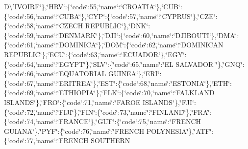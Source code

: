 {D\textbackslash{}'I\-V\-O\-I\-R\-E\char`\"{}\},\char`\"{}H\-R\-V\char`\"{}\-:\{\char`\"{}code\char`\"{}\-:55,\char`\"{}name\char`\"{}\-:\char`\"{}C\-R\-O\-A\-T\-I\-A\char`\"{}\},\char`\"{}C\-U\-B\char`\"{}\-:\{\char`\"{}code\char`\"{}\-:56,\char`\"{}name\char`\"{}\-:\char`\"{}C\-U\-B\-A\char`\"{}\},\char`\"{}C\-Y\-P\char`\"{}\-:\{\char`\"{}code\char`\"{}\-:57,\char`\"{}name\char`\"{}\-:\char`\"{}C\-Y\-P\-R\-U\-S\char`\"{}\},\char`\"{}C\-Z\-E\char`\"{}\-:\{\char`\"{}code\char`\"{}\-:58,\char`\"{}name\char`\"{}\-:\char`\"{}C\-Z\-E\-C\-H R\-E\-P\-U\-B\-L\-I\-C\char`\"{}\},\char`\"{}D\-N\-K\char`\"{}\-:\{\char`\"{}code\char`\"{}\-:59,\char`\"{}name\char`\"{}\-:\char`\"{}D\-E\-N\-M\-A\-R\-K\char`\"{}\},\char`\"{}D\-J\-I\char`\"{}\-:\{\char`\"{}code\char`\"{}\-:60,\char`\"{}name\char`\"{}\-:\char`\"{}D\-J\-I\-B\-O\-U\-T\-I\char`\"{}\},\char`\"{}D\-M\-A\char`\"{}\-:\{\char`\"{}code\char`\"{}\-:61,\char`\"{}name\char`\"{}\-:\char`\"{}D\-O\-M\-I\-N\-I\-C\-A\char`\"{}\},\char`\"{}D\-O\-M\char`\"{}\-:\{\char`\"{}code\char`\"{}\-:62,\char`\"{}name\char`\"{}\-:\char`\"{}D\-O\-M\-I\-N\-I\-C\-A\-N R\-E\-P\-U\-B\-L\-I\-C\char`\"{}\},\char`\"{}E\-C\-U\char`\"{}\-:\{\char`\"{}code\char`\"{}\-:63,\char`\"{}name\char`\"{}\-:\char`\"{}E\-C\-U\-A\-D\-O\-R\char`\"{}\},\char`\"{}E\-G\-Y\char`\"{}\-:\{\char`\"{}code\char`\"{}\-:64,\char`\"{}name\char`\"{}\-:\char`\"{}E\-G\-Y\-P\-T\char`\"{}\},\char`\"{}S\-L\-V\char`\"{}\-:\{\char`\"{}code\char`\"{}\-:65,\char`\"{}name\char`\"{}\-:\char`\"{}E\-L S\-A\-L\-V\-A\-D\-O\-R \char`\"{}\},\char`\"{}G\-N\-Q\char`\"{}\-:\{\char`\"{}code\char`\"{}\-:66,\char`\"{}name\char`\"{}\-:\char`\"{}E\-Q\-U\-A\-T\-O\-R\-I\-A\-L G\-U\-I\-N\-E\-A\char`\"{}\},\char`\"{}E\-R\-I\char`\"{}\-:\{\char`\"{}code\char`\"{}\-:67,\char`\"{}name\char`\"{}\-:\char`\"{}E\-R\-I\-T\-R\-E\-A\char`\"{}\},\char`\"{}E\-S\-T\char`\"{}\-:\{\char`\"{}code\char`\"{}\-:68,\char`\"{}name\char`\"{}\-:\char`\"{}E\-S\-T\-O\-N\-I\-A\char`\"{}\},\char`\"{}E\-T\-H\char`\"{}\-:\{\char`\"{}code\char`\"{}\-:69,\char`\"{}name\char`\"{}\-:\char`\"{}E\-T\-H\-I\-O\-P\-I\-A\char`\"{}\},\char`\"{}F\-L\-K\char`\"{}\-:\{\char`\"{}code\char`\"{}\-:70,\char`\"{}name\char`\"{}\-:\char`\"{}F\-A\-L\-K\-L\-A\-N\-D I\-S\-L\-A\-N\-D\-S\char`\"{}\},\char`\"{}F\-R\-O\char`\"{}\-:\{\char`\"{}code\char`\"{}\-:71,\char`\"{}name\char`\"{}\-:\char`\"{}F\-A\-R\-O\-E I\-S\-L\-A\-N\-D\-S\char`\"{}\},\char`\"{}F\-J\-I\char`\"{}\-:\{\char`\"{}code\char`\"{}\-:72,\char`\"{}name\char`\"{}\-:\char`\"{}F\-I\-J\-I\char`\"{}\},\char`\"{}F\-I\-N\char`\"{}\-:\{\char`\"{}code\char`\"{}\-:73,\char`\"{}name\char`\"{}\-:\char`\"{}F\-I\-N\-L\-A\-N\-D\char`\"{}\},\char`\"{}F\-R\-A\char`\"{}\-:\{\char`\"{}code\char`\"{}\-:74,\char`\"{}name\char`\"{}\-:\char`\"{}F\-R\-A\-N\-C\-E\char`\"{}\},\char`\"{}G\-U\-F\char`\"{}\-:\{\char`\"{}code\char`\"{}\-:75,\char`\"{}name\char`\"{}\-:\char`\"{}F\-R\-E\-N\-C\-H G\-U\-I\-A\-N\-A\char`\"{}\},\char`\"{}P\-Y\-F\char`\"{}\-:\{\char`\"{}code\char`\"{}\-:76,\char`\"{}name\char`\"{}\-:\char`\"{}F\-R\-E\-N\-C\-H P\-O\-L\-Y\-N\-E\-S\-I\-A\char`\"{}\},\char`\"{}A\-T\-F\char`\"{}\-:\{\char`\"{}code\char`\"{}\-:77,\char`\"{}name\char`\"{}\-:\char`\"{}F\-R\-E\-N\-C\-H S\-O\-U\-T\-H\-E\-R\-N }
